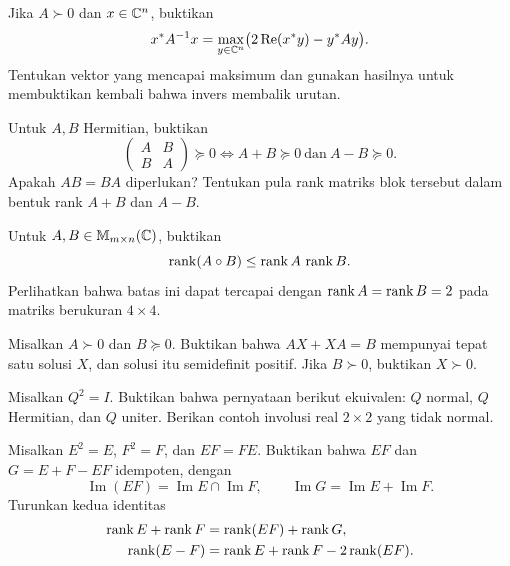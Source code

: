 \begin{latihan}\label{khusus:lat-variasi}
    Jika $A\succ0$ dan $x\in\mathbb{C}^n$, buktikan
    \[
        x^*A^{-1}x=
        \max_{y\in\mathbb{C}^n}\bigl(2\operatorname{Re}(x^*y)-y^*Ay\bigr).
    \]
    Tentukan vektor yang mencapai maksimum dan gunakan hasilnya
    untuk membuktikan kembali bahwa invers membalik urutan.
\end{latihan}

\begin{latihan}\label{khusus:lat-blok}
    Untuk $A,B$ Hermitian, buktikan
    \[
        \begin{pmatrix}A&B\\B&A\end{pmatrix}\succeq0
        \iff A+B\succeq0\ \text{dan}\ A-B\succeq0.
    \]
    Apakah $AB=BA$ diperlukan? Tentukan pula rank matriks blok
    tersebut dalam bentuk rank $A+B$ dan $A-B$.
\end{latihan}

\begin{latihan}\label{khusus:lat-rank-hadamard}
    Untuk $A,B\in\mathbb{M}_{m\times n}(\mathbb{C})$, buktikan
    \[
        \operatorname{rank}(A\circ B)\le\operatorname{rank} A\,\operatorname{rank} B.
    \]
    Perlihatkan bahwa batas ini dapat tercapai dengan
    $\operatorname{rank} A=\operatorname{rank} B=2$ pada matriks berukuran $4\times4$.
\end{latihan}

\begin{latihan}\label{khusus:lat-lyapunov}
    Misalkan $A\succ0$ dan $B\succeq0$.
    Buktikan bahwa $AX+XA=B$ mempunyai tepat satu solusi $X$,
    dan solusi itu semidefinit positif.
    Jika $B\succ0$, buktikan $X\succ0$.
\end{latihan}

\begin{latihan}\label{khusus:lat-involusi}
    Misalkan $Q^2=I$. Buktikan bahwa pernyataan berikut ekuivalen:
    $Q$ normal, $Q$ Hermitian, dan $Q$ uniter.
    Berikan contoh involusi real $2\times2$ yang tidak normal.
\end{latihan}

\begin{latihan}\label{khusus:lat-idempoten}
    Misalkan $E^2=E$, $F^2=F$, dan $EF=FE$. Buktikan bahwa
    $EF$ dan $G=E+F-EF$ idempoten, dengan
    \[
        \operatorname{Im}(EF)=\operatorname{Im}E\cap\operatorname{Im}F,
        \qquad
        \operatorname{Im}G=\operatorname{Im}E+\operatorname{Im}F.
    \]
    Turunkan kedua identitas
    \begin{align*}
        \operatorname{rank} E+\operatorname{rank} F&=\operatorname{rank}(EF)+\operatorname{rank} G,\\
        \operatorname{rank}(E-F)&=\operatorname{rank} E+\operatorname{rank} F-2\operatorname{rank}(EF).
    \end{align*}
\end{latihan}

